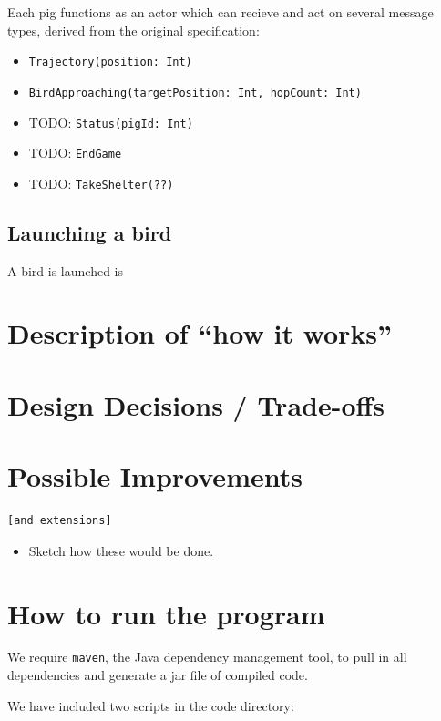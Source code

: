 Each pig functions as an actor which can recieve and act on several
message types, derived from the original specification:

\begin{itemize}
\item
  \texttt{Trajectory(position: Int)}
\item
  \texttt{BirdApproaching(targetPosition: Int, hopCount: Int)}
\item
  TODO: \texttt{Status(pigId: Int)}
\item
  TODO: \texttt{EndGame}
\item
  TODO: \texttt{TakeShelter(??)}
\end{itemize}

\subsection{Launching a bird}

A bird is launched is

\section{Description of ``how it works''}

\section{Design Decisions / Trade-offs}

\section{Possible Improvements}

\begin{verbatim}
[and extensions]
\end{verbatim}

\begin{itemize}
\item
  Sketch how these would be done.
\end{itemize}

\section{How to run the program}

We require \texttt{maven}, the Java dependency management tool, to pull
in all dependencies and generate a jar file of compiled code.

We have included two scripts in the code directory:

